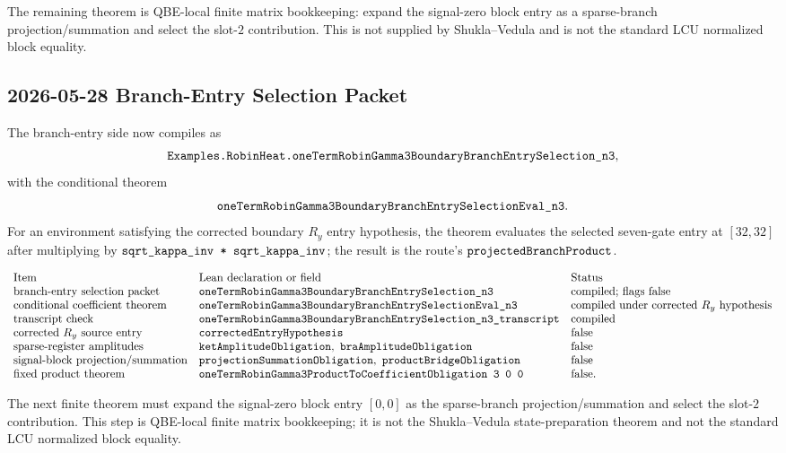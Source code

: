 The remaining theorem is QBE-local finite matrix bookkeeping: expand the
signal-zero block entry as a sparse-branch projection/summation and select the
slot-\(2\) contribution.  This is not supplied by Shukla--Vedula and is not
the standard LCU normalized block equality.

\subsection{2026-05-28 Branch-Entry Selection Packet}

The branch-entry side now compiles as
\[
  \texttt{Examples.RobinHeat.oneTermRobinGamma3BoundaryBranchEntrySelection\_n3},
\]
with the conditional theorem
\[
  \texttt{oneTermRobinGamma3BoundaryBranchEntrySelectionEval\_n3}.
\]
For an environment satisfying the corrected boundary \(R_y\) entry hypothesis,
the theorem evaluates the selected seven-gate entry at \([32,32]\) after
multiplying by
\(\texttt{sqrt\_kappa\_inv * sqrt\_kappa\_inv}\); the result is the route's
\(\texttt{projectedBranchProduct}\).

\[
\begin{array}{lll}
\text{Item} & \text{Lean declaration or field} & \text{Status}\\
\text{branch-entry selection packet} &
\texttt{oneTermRobinGamma3BoundaryBranchEntrySelection\_n3} &
\text{compiled; flags false}\\
\text{conditional coefficient theorem} &
\texttt{oneTermRobinGamma3BoundaryBranchEntrySelectionEval\_n3} &
\text{compiled under corrected }R_y\text{ hypothesis}\\
\text{transcript check} &
\texttt{oneTermRobinGamma3BoundaryBranchEntrySelection\_n3\_transcript} &
\text{compiled}\\
\text{corrected }R_y\text{ source entry} &
\texttt{correctedEntryHypothesis} &
\text{false}\\
\text{sparse-register amplitudes} &
\texttt{ketAmplitudeObligation},\ \texttt{braAmplitudeObligation} &
\text{false}\\
\text{signal-block projection/summation} &
\texttt{projectionSummationObligation},\ \texttt{productBridgeObligation} &
\text{false}\\
\text{fixed product theorem} &
\texttt{oneTermRobinGamma3ProductToCoefficientObligation\ 3\ 0\ 0} &
\text{false}.
\end{array}
\]

The next finite theorem must expand the signal-zero block entry \([0,0]\) as
the sparse-branch projection/summation and select the slot-\(2\) contribution.
This step is QBE-local finite matrix bookkeeping; it is not the
Shukla--Vedula state-preparation theorem and not the standard LCU normalized
block equality.

